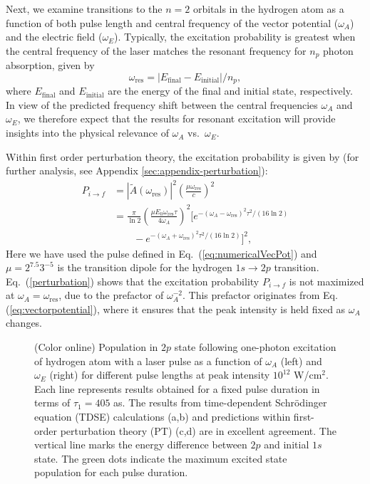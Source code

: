 Next, we examine transitions to the $n=2$ orbitals in the hydrogen atom as a function of both pulse length and central frequency of the vector potential ($\omega_A$) and the electric field ($\omega_E$).
Typically, the excitation probability is greatest when the central frequency of the laser matches the resonant frequency for $n_p$ photon absorption, given by
\begin{equation}
\omega_{\text{res}} = |E_\text{final} - E_\text{initial}|/n_p,
\end{equation}
where $E_\text{final}$ and $E_\text{initial}$ are the energy of the final and initial state, respectively. In view of the predicted frequency shift between the central frequencies $\omega_A$ and $\omega_E$, we therefore expect that the results for resonant excitation will provide insights into the physical relevance of $\omega_A$ vs.~$\omega_E$.

Within first order perturbation theory, the excitation probability is given by (for further analysis, see Appendix \ref{sec:appendix-perturbation}):
\begin{equation}
\begin{split}
P_{i\rightarrow f}&= |\tilde{A}(\omega_\text{res})|^2\left(\frac{\mu\omega_\text{res}}{c}\right)^2 \\
&=\frac{\pi}{\ln{2}}\left(\frac{\mu E_0\omega_\text{res}\tau}{4\omega_A}\right)^2
\Big[e^{-(\omega_A-\omega_\text{res})^2\tau^2/(16\ln{2})}\\
&\qquad -
e^{-(\omega_A+\omega_\text{res})^2\tau^2/(16\ln{2})}
\Big]^2,
\end{split}
\label{perturbation}
\end{equation}
Here we have used the pulse defined in Eq.~(\ref{eq:numericalVecPot}) and $\mu=2^{7.5}3^{-5}$ is the transition dipole for the hydrogen $1s\rightarrow 2p$ transition. Eq.~(\ref{perturbation}) shows that the excitation probability $P_{i\rightarrow f}$ is not maximized at  $\omega_A=\omega_\text{res}$, due to the prefactor of $\omega_A^{-2}$. This prefactor originates from Eq. (\ref{eq:vectorpotential}), where it ensures that the peak intensity is held fixed as $\omega_A$ changes.

\begin{figure}[t]
\centering
\caption{(Color online)
Population in $2p$ state following one-photon excitation of hydrogen atom with a laser pulse as a function of $\omega_A$ (left) and $\omega_E$ (right) for different pulse lengths at peak intensity $10^{12}$ W/cm$^2$. Each line represents results obtained for a fixed pulse duration in terms of $\tau_1=405$ as. The results from time-dependent Schr\"odinger equation (TDSE) calculations (a,b) and predictions within first-order perturbation theory (PT) (c,d) are in excellent agreement. The vertical line marks the energy difference between $2p$ and initial $1s$ state. The green dots indicate the maximum excited state population for each pulse duration. 
}
  \label{fig:h-excited_2p}
\end{figure}

